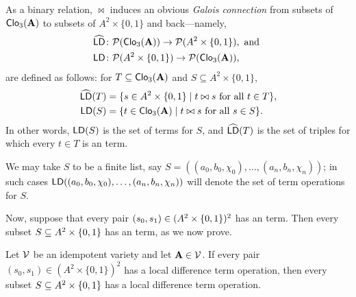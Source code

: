 As a binary relation, $\bowtie$ induces an obvious \emph{Galois connection}
from subsets of $\operatorname{\mathsf{Clo}}_3(\mathbf{A})$ to subsets of $A^2\times \{0,1\}$ and
back---namely,
\begin{align*}
\mathsf{\widehat{LD}} &\colon \mathcal{P}(\operatorname{\mathsf{Clo}}_3(\mathbf{A})) \to \mathcal{P}(A^2\times \{0,1\}), \text{
  and }\\
\mathsf{LD} &\colon \mathcal{P}(A^2 \times \{0,1\}) \to \mathcal{P}(\operatorname{\mathsf{Clo}}_3(\mathbf{A})),
\end{align*}
are defined as follows:
for $T \subseteq \operatorname{\mathsf{Clo}}_3(\mathbf{A})$ and $S \subseteq A^2 \times \{0,1\}$,
\begin{align*}
  \mathsf{\widehat{LD}}(T) &= \{s \in A^2 \times \{0,1\} \mid t \bowtie s
  \text{ for all } t \in T\},\\
  \mathsf{LD}(S) &= \{t \in \operatorname{\mathsf{Clo}}_3(\mathbf{A}) \mid t \bowtie s
  \text{ for all } s \in S\}.
\end{align*}
In other words, $\mathsf{LD}(S)$ is the set of \ld terms
for $S$, and $\mathsf{\widehat{LD}}(T)$ is the set of triples for which every $t\in T$ is an \ld term.

We may take $S$ to be a finite list,
say $S = ((a_0, b_0, \chi_0), \dots, (a_n, b_n, \chi_n))$;
in such cases $\mathsf{LD}((a_0, b_0, \chi_0), \dots, (a_n, b_n, \chi_n))$
will denote the set of \ld term operations for $S$.

Now, suppose that every pair
$(s_0, s_1)\in (A^2 \times \{0,1\})^2$ %
has an \ld term.  
Then every subset $S\subseteq A^2 \times \{0,1\}$
has an \ld term, as we now prove.


\begin{theorem} %
  \label{thm:local-diff-terms}
  Let $\mathcal{V}$ be an idempotent variety and let
  $\mathbf{A}  \in \mathcal{V}$. %
  If every pair
  $(s_0, s_1) \in (A^2 \times \{0,1\})^2$
  has a local difference term operation, then
  every subset $S \subseteq A^2 \times \{0,1\}$
  has a local difference term operation.
\end{theorem}


